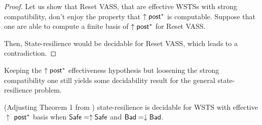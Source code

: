 \begin{proof}
Let us show that Reset VASS, that are effective WSTSs with strong compatibility, don't enjoy the property that $\uparrow \textsf{post}^*$ is computable.
Suppose that one are able to compute a finite basis of $\uparrow \textsf{post}^*$ for Reset VASS. 
\iffalse
Then, one would be able to decide whether an element $m \in \min(\uparrow \post^*)$ is reachable.
by examining if there is %
$0$ in the basis%
. But reachability of $0$  %
is undecidable for Reset VASS. 
\fi
Then, {\sc State-resilience} would be decidable for Reset VASS, which leads to a contradiction.
\end{proof}



%
%
%











Keeping the $\uparrow \textsf{post}^*$ effectiveness hypothesis but loosening the strong compatibility one still yields some decidability result for the general state-resilience problem.


\begin{theorem}{(Adjusting Theorem 1 from \cite{DBLP:journals/corr/abs-2108-00889})}\label{post srp}
{\sc state-resilience} is decidable for 
 WSTS with effective 
$\uparrow$ $\textsf{post}^*$ basis
when
$\textsf{Safe}=\uparrow \textsf{Safe}$
and $\textsf{Bad}=\downarrow \textsf{Bad}$.
\end{theorem}


